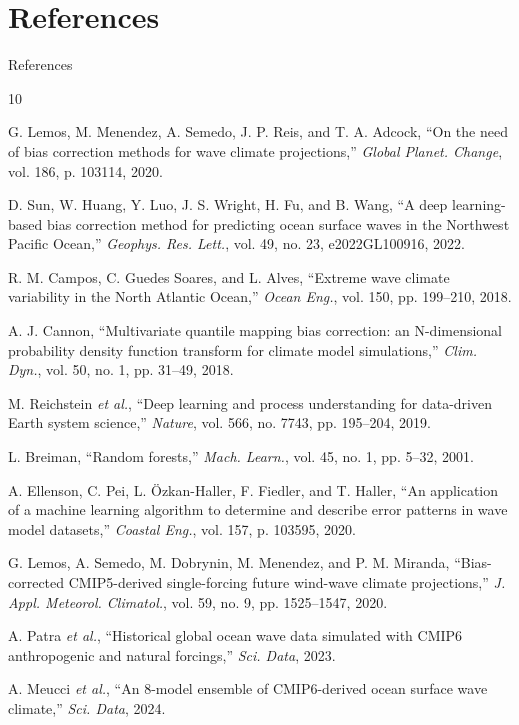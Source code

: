 \documentclass[aspectratio=169]{beamer}
\newcommand{\footerdetails}{}
\newcommand{\setfooter}[1]{\renewcommand{\footerdetails}{#1}}
\begin{document}
\section{References}
\begin{frame}[allowframebreaks]{References}
  \setfooter{Relevant literature and project citations}
  \scriptsize
  \begin{thebibliography}{10}

    G. Lemos, M. Menendez, A. Semedo, J. P. Reis, and T. A. Adcock, ``On the need of bias correction methods for wave climate projections,'' \textit{Global Planet. Change}, vol. 186, p. 103114, 2020.

    D. Sun, W. Huang, Y. Luo, J. S. Wright, H. Fu, and B. Wang, ``A deep learning-based bias correction method for predicting ocean surface waves in the Northwest Pacific Ocean,'' \textit{Geophys. Res. Lett.}, vol. 49, no. 23, e2022GL100916, 2022.

    R. M. Campos, C. Guedes Soares, and L. Alves, ``Extreme wave climate variability in the North Atlantic Ocean,'' \textit{Ocean Eng.}, vol. 150, pp. 199--210, 2018.

    A. J. Cannon, ``Multivariate quantile mapping bias correction: an N-dimensional probability density function transform for climate model simulations,'' \textit{Clim. Dyn.}, vol. 50, no. 1, pp. 31--49, 2018.

    M. Reichstein \textit{et al.}, ``Deep learning and process understanding for data-driven Earth system science,'' \textit{Nature}, vol. 566, no. 7743, pp. 195--204, 2019.

    L. Breiman, ``Random forests,'' \textit{Mach. Learn.}, vol. 45, no. 1, pp. 5--32, 2001.

    A. Ellenson, C. Pei, L. \"Ozkan-Haller, F. Fiedler, and T. Haller, ``An application of a machine learning algorithm to determine and describe error patterns in wave model datasets,'' \textit{Coastal Eng.}, vol. 157, p. 103595, 2020.

    G. Lemos, A. Semedo, M. Dobrynin, M. Menendez, and P. M. Miranda, ``Bias-corrected CMIP5-derived single-forcing future wind-wave climate projections,'' \textit{J. Appl. Meteorol. Climatol.}, vol. 59, no. 9, pp. 1525--1547, 2020.

    A. Patra \textit{et al.}, ``Historical global ocean wave data simulated with CMIP6 anthropogenic and natural forcings,'' \textit{Sci. Data}, 2023.

    A. Meucci \textit{et al.}, ``An 8-model ensemble of CMIP6-derived ocean surface wave climate,'' \textit{Sci. Data}, 2024.

  \end{thebibliography}
\end{frame}
\end{document}
